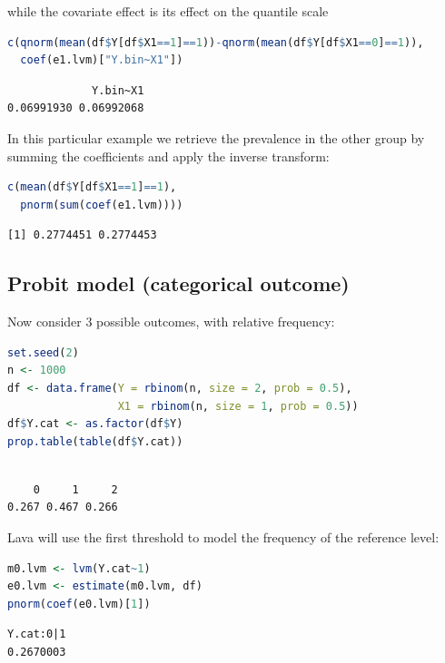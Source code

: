 \documentclass{article}
\begin{document}
while the covariate effect is its effect on the quantile scale
\begin{lstlisting}[language=r,numbers=none]
c(qnorm(mean(df$Y[df$X1==1]==1))-qnorm(mean(df$Y[df$X1==0]==1)),
  coef(e1.lvm)["Y.bin~X1"])
\end{lstlisting}

\label{}
\begin{verbatim}
             Y.bin~X1 
0.06991930 0.06992068
\end{verbatim}


In this particular example we retrieve the prevalence in the other
group by summing the coefficients and apply the inverse transform:
\begin{lstlisting}[language=r,numbers=none]
c(mean(df$Y[df$X1==1]==1),
  pnorm(sum(coef(e1.lvm))))

\end{lstlisting}

\label{}
\begin{verbatim}
[1] 0.2774451 0.2774453
\end{verbatim}
\subsection{Probit model (categorical outcome)}
\label{sec:org6b50702}

Now consider 3 possible outcomes, with relative frequency:
\begin{lstlisting}[language=r,numbers=none]
set.seed(2)
n <- 1000
df <- data.frame(Y = rbinom(n, size = 2, prob = 0.5),
                 X1 = rbinom(n, size = 1, prob = 0.5))
df$Y.cat <- as.factor(df$Y)
prop.table(table(df$Y.cat))
\end{lstlisting}

\label{}
\begin{verbatim}

    0     1     2 
0.267 0.467 0.266
\end{verbatim}


Lava will use the first threshold to model the frequency of the reference level:
\begin{lstlisting}[language=r,numbers=none]
m0.lvm <- lvm(Y.cat~1)
e0.lvm <- estimate(m0.lvm, df)
pnorm(coef(e0.lvm)[1])
\end{lstlisting}

\label{}
\begin{verbatim}
Y.cat:0|1 
0.2670003
\end{verbatim}
\end{document}
